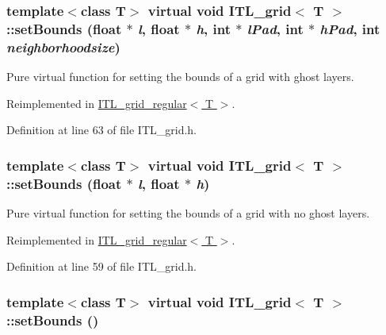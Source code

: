 \hypertarget{classITL__grid_adf6baf011a2d80f49a7e6007bcd190c7}{
\subsubsection[{setBounds}]{\setlength{\rightskip}{0pt plus 5cm}template$<$class T$>$ virtual void {\bf ITL\_\-grid}$<$ T $>$::setBounds (float $\ast$ {\em l}, \/  float $\ast$ {\em h}, \/  int $\ast$ {\em lPad}, \/  int $\ast$ {\em hPad}, \/  int {\em neighborhoodsize})}}
\label{classITL__grid_adf6baf011a2d80f49a7e6007bcd190c7}


Pure virtual function for setting the bounds of a grid with ghost layers. 



Reimplemented in \hyperlink{classITL__grid__regular_ac64d7fd91b4330f961979a6d7127d9f6}{ITL\_\-grid\_\-regular$<$ T $>$}.



Definition at line 63 of file ITL\_\-grid.h.

\hypertarget{classITL__grid_a808e49a6b0fe44a13f80df372146ce13}{
\subsubsection[{setBounds}]{\setlength{\rightskip}{0pt plus 5cm}template$<$class T$>$ virtual void {\bf ITL\_\-grid}$<$ T $>$::setBounds (float $\ast$ {\em l}, \/  float $\ast$ {\em h})}}
\label{classITL__grid_a808e49a6b0fe44a13f80df372146ce13}


Pure virtual function for setting the bounds of a grid with no ghost layers. 



Reimplemented in \hyperlink{classITL__grid__regular_aae7fcdd0c0da2df91cbe6b658a7ce43c}{ITL\_\-grid\_\-regular$<$ T $>$}.



Definition at line 59 of file ITL\_\-grid.h.

\hypertarget{classITL__grid_a1df10dfdfddabe79e089aba810eccd8f}{
\subsubsection[{setBounds}]{\setlength{\rightskip}{0pt plus 5cm}template$<$class T$>$ virtual void {\bf ITL\_\-grid}$<$ T $>$::setBounds ()}}
\label{classITL__grid_a1df10dfdfddabe79e089aba810eccd8f}



